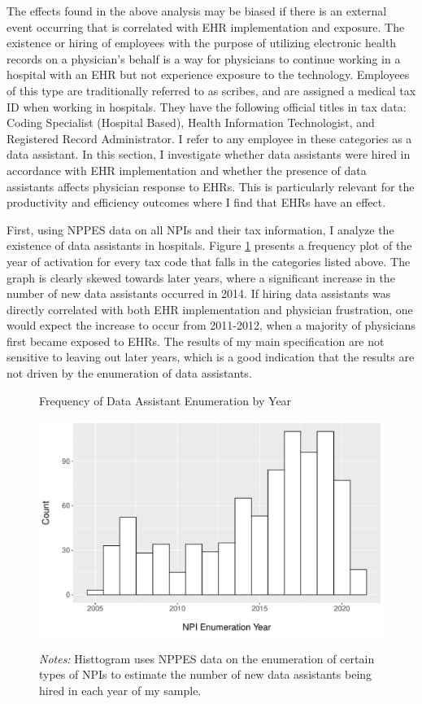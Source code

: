 \documentclass[12pt]{article}
\begin{document}
The effects found in the above analysis may be biased if there is an external event occurring that is correlated with EHR implementation and exposure. The existence or hiring of employees with the purpose of utilizing electronic health records on a physician's behalf is a way for physicians to continue working in a hospital with an EHR but not experience exposure to the technology. Employees of this type are traditionally referred to as scribes, and are assigned a medical tax ID when working in hospitals. They have the following official titles in tax data: Coding Specialist (Hospital Based), Health Information Technologist, and Registered Record Administrator. I refer to any employee in these categories as a data assistant. In this section, I investigate whether data assistants were hired in accordance with EHR implementation and whether the presence of data assistants affects physician response to EHRs. This is particularly relevant for the productivity and efficiency outcomes where I find that EHRs have an effect.  

First, using NPPES data on all NPIs and their tax information, I analyze the existence of data assistants in hospitals. Figure \ref{fig:dataassistant_histogram} presents a frequency plot of the year of activation for every tax code that falls in the categories listed above. The graph is clearly skewed towards later years, where a significant increase in the number of new data assistants occurred in 2014. If hiring data assistants was directly correlated with both EHR implementation and physician frustration, one would expect the increase to occur from 2011-2012, when a majority of physicians first became exposed to EHRs. The results of my main specification are not sensitive to leaving out later years, which is a good indication that the results are not driven by the enumeration of data assistants. 

\begin{figure}[t]
\centering
\captionsetup{width=.5\linewidth}
\caption{Frequency of Data Assistant Enumeration by Year}
\includegraphics[scale=.5]{Objects/dataassistant_histogram.pdf}
\label{fig:dataassistant_histogram}
\vspace{2mm}
    \caption*{\footnotesize{\textit{Notes:} Histtogram uses NPPES data on the enumeration of certain types of NPIs to estimate the number of new data assistants being hired in each year of my sample.}}
\end{figure}
\end{document}
